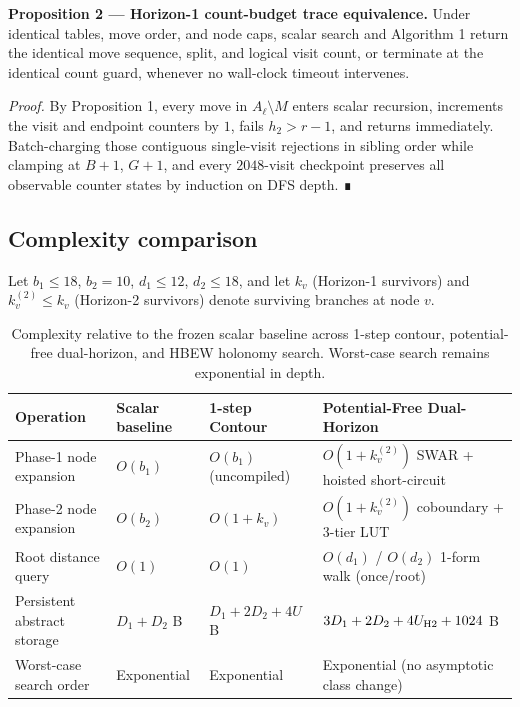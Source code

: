 \documentclass[10pt,twocolumn,letterpaper]{article}
\begin{document}
\textbf{Proposition 2 --- Horizon-1 count-budget trace equivalence.}
Under identical tables, move order, and node caps, scalar search and
Algorithm 1 return the identical move sequence, split, and logical visit
count, or terminate at the identical count guard, whenever no wall-clock
timeout intervenes.

\emph{Proof.} By Proposition 1, every move in \(A_\ell \setminus M\)
enters scalar recursion, increments the visit and endpoint counters by
\(1\), fails \(h_2 > r - 1\), and returns immediately. Batch-charging
those contiguous single-visit rejections in sibling order while clamping
at \(B+1\), \(G+1\), and every \(2048\)-visit checkpoint preserves all
observable counter states by induction on DFS depth. ∎

\hypertarget{complexity-comparison}{%
\subsection{Complexity comparison}\label{complexity-comparison}}

Let \(b_1\le 18\), \(b_2=10\), \(d_1\le 12\), \(d_2\le 18\), and let
\(k_v\) (Horizon-1 survivors) and \(k_v^{(2)} \le k_v\) (Horizon-2
survivors) denote surviving branches at node \(v\).

\begin{table}[t]
\caption{Complexity relative to the frozen scalar baseline across 1-step contour, potential-free dual-horizon, and HBEW holonomy search. Worst-case search remains exponential in depth.}
\centering\small
\begin{tabularx}{\textwidth}{@{}p{}LLp{0.28\textwidth}@{}}
\toprule
Operation & Scalar baseline & 1-step Contour & Potential-Free Dual-Horizon \\
\midrule
Phase-1 node expansion & \(O(b_1)\) & \(O(b_1)\) (uncompiled) & \(O(1+k_v^{(2)})\) SWAR + hoisted short-circuit \\
Phase-2 node expansion & \(O(b_2)\) & \(O(1+k_v)\) & \(O(1+k_v^{(2)})\) coboundary + 3-tier LUT \\
Root distance query & \(O(1)\) & \(O(1)\) & \(O(d_1)\) / \(O(d_2)\) 1-form walk (once/root) \\
Persistent abstract storage & \(D_1+D_2\) B & \(D_1+2D_2+4U\) B & \(3D_1+2D_2+4U_{\rm H2}+1024\) B \\
Worst-case search order & Exponential & Exponential & Exponential (no asymptotic class change) \\
\bottomrule
\end{tabularx}
\end{table}
\end{document}
